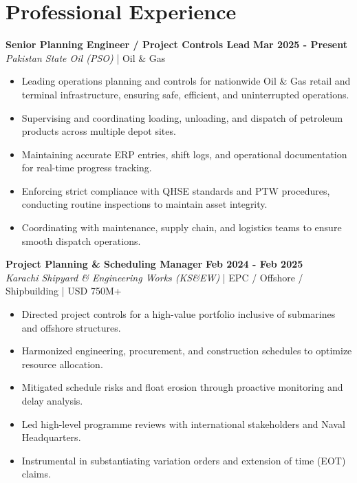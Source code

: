 \documentclass[11pt,a4paper]{article}
\begin{document}
\section{Professional Experience}
\noindent \textbf{\large Senior Planning Engineer / Project Controls Lead} \hfill \textbf{\color{awesome-blue}Mar 2025 - Present}\\
\textit{Pakistan State Oil (PSO)} | Oil \& Gas\\
\begin{itemize}
    \item Leading operations planning and controls for nationwide Oil \& Gas retail and terminal infrastructure, ensuring safe, efficient, and uninterrupted operations.
    \item Supervising and coordinating loading, unloading, and dispatch of petroleum products across multiple depot sites.
    \item Maintaining accurate ERP entries, shift logs, and operational documentation for real-time progress tracking.
    \item Enforcing strict compliance with QHSE standards and PTW procedures, conducting routine inspections to maintain asset integrity.
    \item Coordinating with maintenance, supply chain, and logistics teams to ensure smooth dispatch operations.
\end{itemize}

\noindent \textbf{\large Project Planning \& Scheduling Manager} \hfill \textbf{\color{awesome-blue}Feb 2024 - Feb 2025}\\
\textit{Karachi Shipyard \& Engineering Works (KS\&EW)} | EPC / Offshore / Shipbuilding | USD 750M+\\
\begin{itemize}
    \item Directed project controls for a high-value portfolio inclusive of submarines and offshore structures.
    \item Harmonized engineering, procurement, and construction schedules to optimize resource allocation.
    \item Mitigated schedule risks and float erosion through proactive monitoring and delay analysis.
    \item Led high-level programme reviews with international stakeholders and Naval Headquarters.
    \item Instrumental in substantiating variation orders and extension of time (EOT) claims.
\end{itemize}
\end{document}
